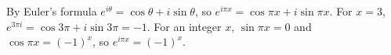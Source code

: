 By Euler's formula $e^{i\theta}=\cos\theta+i\sin\theta$, so $e^{i\pi x}=\cos\pi x+i\sin\pi x$. For $x=3$, $e^{3\pi i}=\cos3\pi+i\sin3\pi=\boxed{-1}$. For an integer $x$, $\sin\pi x=0$ and $\cos\pi x=(-1)^x$, so $e^{i\pi x}=(-1)^x$.
